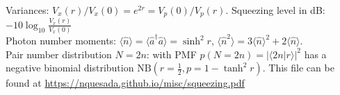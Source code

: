 \documentclass[12pt,letterpaper]{article}
\newcommand{\braket}[1]{\langle #1 \rangle}
\begin{document}
\begin{table}[!h]
{Variances: $V_x(r)/V_x(0) = e^{2r} = V_p(0)/V_p(r)$.  Squeezing level in dB: $-10 \log_{10} \frac{V_x(r)}{V_x(0)}$ \\
Photon number moments: $\langle \hat n \rangle  = \langle \hat a^\dagger \hat a \rangle  = \sinh^2 r$, $\langle \hat n^2 \rangle = 3 \langle \hat n \rangle ^2 + 2 \langle \hat n \rangle$. \\
Pair number distribution $N=2n$: with PMF $p(N=2n) = |\braket{2n|r}|^2$ has a negative binomial distribution $\text{NB}\left(r=\tfrac{1}{2},p = 1-\tanh^2 r\right)$. This file can be found at \url{https://nquesada.github.io/misc/squeezing.pdf}
}

\end{table}
\end{document}
